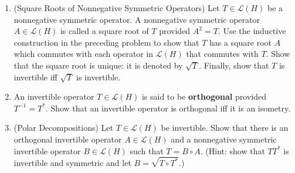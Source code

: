 \begin{enumerate}
\begin{enumerate}[(i)]
    \end{enumerate}
    \item (Square Roots of Nonnegative Symmetric Operators) Let $T\in\mathcal{L}(H)$ be a nonnegative symmetric operator.
    A nonnegative symmetric operator $A\in\mathcal{L}(H)$ is called a square root of $T$ provided $A^2=T$.
    Use the inductive construction in the preceding problem to show that $T$ has a square root $A$ which commutes with each operator in $\mathcal{L}(H)$ that commutes with $T$.
    Show that the square root is unique: it is denoted by $\sqrt{T}$.
    Finally, show that $T$ is invertible iff $\sqrt{T}$ is invertible.
    \item An invertible operator $T\in\mathcal{L}(H)$ is said to be \textbf{orthogonal} provided $T^{-1}=T^*$.
    Show that an invertible operator is orthogonal iff it is an isometry.
    \item (Polar Decompositions) Let $T\in\mathcal{L}(H)$ be invertible.
    Show that there is an orthogonal invertible operator $A\in\mathcal{L}(H)$ and a nonnegative symmetric invertible operator $B\in\mathcal{L}(H)$ such that $T=B\circ A$. 
    (Hint: show that $TT^*$ is invertible and symmetric and let $B=\sqrt{T\circ T^*}$.)
\end{enumerate}

